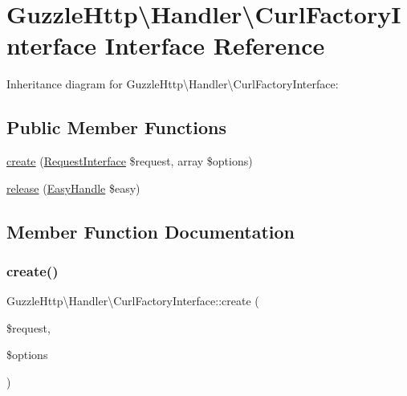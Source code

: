 \hypertarget{interfaceGuzzleHttp_1_1Handler_1_1CurlFactoryInterface}{}\section{Guzzle\+Http\textbackslash{}Handler\textbackslash{}Curl\+Factory\+Interface Interface Reference}
\label{interfaceGuzzleHttp_1_1Handler_1_1CurlFactoryInterface}


Inheritance diagram for Guzzle\+Http\textbackslash{}Handler\textbackslash{}Curl\+Factory\+Interface\+:
\subsection*{Public Member Functions}
\begin{DoxyCompactItemize}
\item 
\hyperlink{interfaceGuzzleHttp_1_1Handler_1_1CurlFactoryInterface_a217c1fafd2be00752ce7fe36917dfac4}{create} (\hyperlink{interfacePsr_1_1Http_1_1Message_1_1RequestInterface}{Request\+Interface} \$request, array \$options)
\item 
\hyperlink{interfaceGuzzleHttp_1_1Handler_1_1CurlFactoryInterface_a06148710fa2805f414b2246c2e3ce2c2}{release} (\hyperlink{classGuzzleHttp_1_1Handler_1_1EasyHandle}{Easy\+Handle} \$easy)
\end{DoxyCompactItemize}


\subsection{Member Function Documentation}
\mbox{\label{interfaceGuzzleHttp_1_1Handler_1_1CurlFactoryInterface_a217c1fafd2be00752ce7fe36917dfac4}} 
\subsubsection{\texorpdfstring{create()}{create()}}
{\footnotesize\ttfamily Guzzle\+Http\textbackslash{}\+Handler\textbackslash{}\+Curl\+Factory\+Interface\+::create (\begin{DoxyParamCaption}\item[{\hyperlink{interfacePsr_1_1Http_1_1Message_1_1RequestInterface}{Request\+Interface}}]{\$request,  }\item[{array}]{\$options }\end{DoxyParamCaption})}

